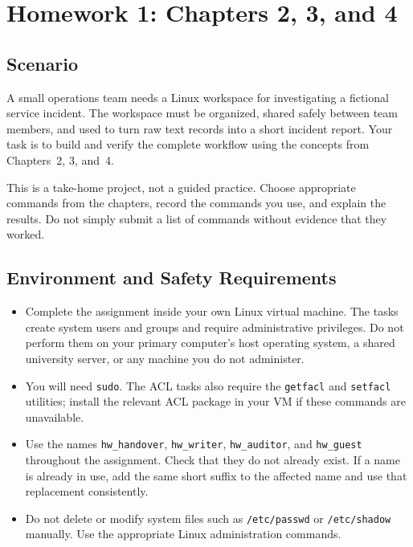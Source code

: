 
\chapter*{Homework 1: Chapters 2, 3, and 4}
\label{ch:homework-ch2-ch3-ch4}

\setcounter{secnumdepth}{0}

\section{Scenario}
A small operations team needs a Linux workspace for investigating a fictional service incident. The workspace must be organized, shared safely between team members, and used to turn raw text records into a short incident report. Your task is to build and verify the complete workflow using the concepts from Chapters~2, 3, and~4.

This is a take-home project, not a guided practice. Choose appropriate commands from the chapters, record the commands you use, and explain the results. Do not simply submit a list of commands without evidence that they worked.

\section{Environment and Safety Requirements}
\begin{itemize}
    \item Complete the assignment inside your own Linux virtual machine. The tasks create system users and groups and require administrative privileges. Do not perform them on your primary computer's host operating system, a shared university server, or any machine you do not administer.
    \item You will need \texttt{sudo}. The ACL tasks also require the \texttt{getfacl} and \texttt{setfacl} utilities; install the relevant ACL package in your VM if these commands are unavailable.
    \item Use the names \texttt{hw\_handover}, \texttt{hw\_writer}, \texttt{hw\_auditor}, and \texttt{hw\_guest} throughout the assignment. Check that they do not already exist. If a name is already in use, add the same short suffix to the affected name and use that replacement consistently.
    \item Do not delete or modify system files such as \texttt{/etc/passwd} or \texttt{/etc/shadow} manually. Use the appropriate Linux administration commands.
\end{itemize}

